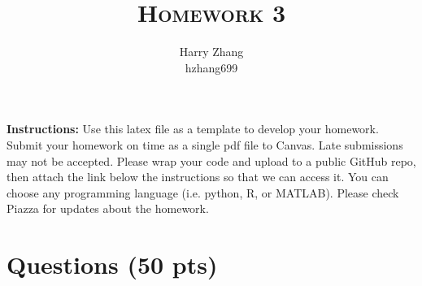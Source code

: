 \documentclass[a4paper]{article}
\title{\textsc{Homework 3}} %
\author{
Harry Zhang\\
hzhang699\\
}
\date{}
\theoremstyle{definition}
\begin{document}
\maketitle 


\textbf{Instructions:} 
Use this latex file as a template to develop your homework. Submit your homework on time as a single pdf file to Canvas. Late submissions may not be accepted. Please wrap your code and upload to a public GitHub repo, then attach the link below the instructions so that we can access it. You can choose any programming language (i.e. python, R, or MATLAB). Please check Piazza for updates about the homework.

\section{Questions (50 pts)}
\end{document}
